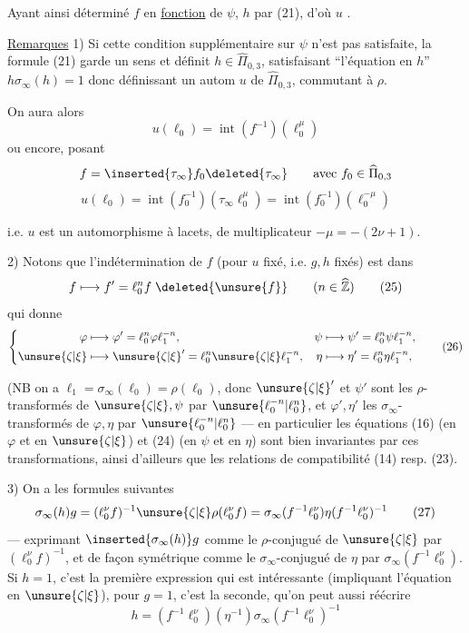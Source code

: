Ayant ainsi déterminé $f$ en \uline{fonction} de $\psi$,  $h$ par (21), d'où $u$ .

\uline{Remarques} 1) Si cette condition supplémentaire sur $\psi$ n'est pas satisfaite, la  formule (21) garde un sens et définit $h\in\widehat{\Pi}_{0,3}$, satisfaisant ``l'équation en $h$'' $h\sigma_\infty(h)=1$ donc définissant un autom $u$ de $\widehat{\Pi}_{0,3}$, commutant à $\rho$.

On aura alors
\[
u(\ell_0)=\operatorname{int}(f^{-1})(\ell_0^\mu)
\]
ou encore, posant
\[
f=\inserted{\tau_\infty}f_0\deleted{\tau_\infty}\qquad\text{avec }f_0\in\widehat{\Pi}_{0,3}
\]
\[
u(\ell_0)=\operatorname{int}(f_0^{-1})(\tau_\infty\ell_0^\mu)=\operatorname{int}(f_0^{-1})(\ell_0^{-\mu})
\]



i.e. $u$ est un automorphisme à lacets, de multiplicateur $-\mu=-(2\nu+1)$.

2) Notons que l'indétermination de $f$ (pour $u$ fixé, i.e. $g,h$ fixés) est dans
\[
 f\longmapsto f'=\ell_0^n f\;\deleted{\unsure{f}}
 \qquad(n\in\widehat{\mathbb Z})
 \tag{25}
\]
qui donne
\[
 \left\{\begin{aligned}
 \varphi&\longmapsto\varphi'=\ell_0^n\varphi\ell_1^{-n},&
 \psi&\longmapsto\psi'=\ell_0^n\psi\ell_1^{-n},\\
 \unsure{\zeta|\xi}&\longmapsto\unsure{\zeta|\xi}'=\ell_0^n\unsure{\zeta|\xi}\ell_1^{-n},&
 \eta&\longmapsto\eta'=\ell_0^n\eta\ell_1^{-n},
 \end{aligned}\right.
 \tag{26}
\]

(NB on a $\ell_1=\sigma_\infty(\ell_0)=\rho(\ell_0)$, donc $\unsure{\zeta|\xi}'$ et $\psi'$ sont les $\rho$-transformés de $\unsure{\zeta|\xi},\psi$ par $\unsure{\ell_0^{-n}|\ell_0^n}$, et $\varphi',\eta'$ les $\sigma_\infty$-transformés de $\varphi,\eta$ par $\unsure{\ell_0^{-n}|\ell_0^n}$ --- en particulier les équations (16) (en $\varphi$ et en $\unsure{\zeta|\xi}$) et (24) (en $\psi$ et en $\eta$) sont bien invariantes par ces transformations, ainsi d'ailleurs que les relations de compatibilité (14) resp. (23).

3) On a les formules suivantes 
\[
 \sigma_\infty(h)g
 = (\ell_0^\nu f)^{-1}\unsure{\zeta|\xi}\rho(\ell_0^\nu f)
 = \sigma_\infty(f^{-1}\ell_0^\nu)\eta(f^{-1}\ell_0^\nu)^{-1}
 \tag{27}
\]
 --- exprimant $\inserted{\sigma_\infty(h)}g$ comme le $\rho$-conjugué de $\unsure{\zeta|\xi}$ par $(\ell_0^\nu f)^{-1}$, et de façon symétrique  comme le $\sigma_\infty$-conjugué de $\eta$ par $\sigma_\infty(f^{-1}\ell_0^\nu)$. Si $h=1$, c'est la première expression qui est intéressante (impliquant l'équation en $\unsure{\zeta|\xi}$), pour $g=1$, c'est la seconde, qu'on peut aussi réécrire 
\[
 h=(f^{-1}\ell_0^\nu)(\eta^{-1})\sigma_\infty(f^{-1}\ell_0^\nu)^{-1}
 \tag{28}
\]

